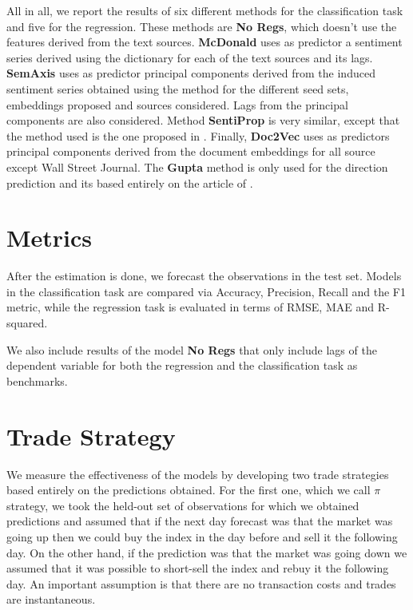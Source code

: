 \documentclass[a4paper, 12pt]{report}
\begin{document}
    All in all, we report the results of six different methods for the classification task and five for the regression. These methods are \textbf{No Regs}, which doesn't use the features derived from the text sources. \textbf{McDonald} uses as predictor a sentiment series derived using the \textcite{Loughran:2011} dictionary for each of the text sources and its lags. \textbf{SemAxis} uses as predictor principal components derived from the induced sentiment series obtained using the \textcite{An:2018} method for the different seed sets, embeddings proposed and sources considered. Lags from the principal components are also considered.  Method \textbf{SentiProp} is very similar, except that the method used is the one proposed in \textcite{Hamilton:2016}. Finally, \textbf{Doc2Vec} uses as predictors principal components derived from the document embeddings for all source except Wall Street Journal. The \textbf{Gupta} method is only used for the direction prediction and its based entirely on the article of \textcite{Gupta:2020}. 
    
    \section{Metrics}
    
    After the estimation is done, we forecast the observations in the test set. Models in the classification task are compared via Accuracy, Precision, Recall and the F1 metric, while the regression task is evaluated in terms of RMSE, MAE and R-squared.  
    
    We also include results of the model \textbf{No Regs} that only include lags of the dependent variable for both the regression and the classification task as benchmarks. 
    
    \section{Trade Strategy}
    \label{TS}
    We measure the effectiveness of the models by developing two trade strategies based entirely on the predictions obtained. For the first one, which we call $\pi$ strategy, we took the held-out set of observations for which we obtained predictions and assumed that if the next day forecast was that the market was going up then we could buy the index in the day before and sell it the following day. On the other hand, if the prediction was that the market was going down we assumed that it was possible to short-sell the index and rebuy it the following day. An important assumption is that there are no transaction costs and trades are instantaneous. 
    
\end{document}
